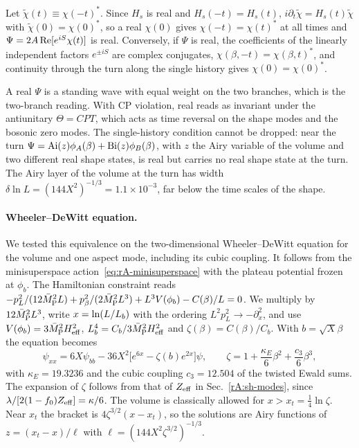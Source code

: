 \begin{rAproof}
Let $\tilde\chi(t)\equiv\chi(-t)^*$.
Since $H_s$ is real and $H_s(-t)=H_s(t)$, $i\partial_t\tilde\chi=H_s(t)\tilde\chi$ with $\tilde\chi(0)=\chi(0)^*$, so a real $\chi(0)$ gives $\chi(-t)=\chi(t)^*$ at all times and $\Psi=2A\,{\rm Re}[e^{iS}\chi(t)]$ is real.
Conversely, if $\Psi$ is real, the coefficients of the linearly independent factors $e^{\pm iS}$ are complex conjugates, $\chi(\beta,-t)=\chi(\beta,t)^*$, and continuity through the turn along the single history gives $\chi(0)=\chi(0)^*$.
\end{rAproof}

A real $\Psi$ is a standing wave with equal weight on the two branches, which is the two-branch reading.
With CP violation, real reads as invariant under the antiunitary $\Theta=CPT$, which acts as time reversal on the shape modes and the bosonic zero modes.
The single-history condition cannot be dropped: near the turn $\Psi={\rm Ai}(z)\phi_A(\beta)+{\rm Bi}(z)\phi_B(\beta)$, with $z$ the Airy variable of the volume and two different real shape states, is real but carries no real shape state at the turn.
The Airy layer of the volume at the turn has width $\delta\ln L=(144X^2)^{-1/3}=1.1\times10^{-3}$, far below the time scales of the shape. %

\paragraph{Wheeler--DeWitt equation.}
We tested this equivalence on the two-dimensional Wheeler--DeWitt equation for the volume and one aspect mode, including its cubic coupling.
It follows from the minisuperspace action~\eqref{eq:rA-minisuperspace} with the plateau potential frozen at $\phi_b$.
The Hamiltonian constraint reads $-p_L^2/(12\bar M_{\mathrm{P}}^2L)+p_\beta^2/(2\bar M_{\mathrm{P}}^2L^3)+L^3V(\phi_b)-C(\beta)/L=0$.
We multiply by $12\bar M_{\mathrm{P}}^2L^3$, write $x=\ln(L/L_b)$ with the ordering $L^2p_L^2\to-\partial_x^2$, and use $V(\phi_b)=3\bar M_{\mathrm{P}}^2H_{\mathrm{eff}}^2$, $L_b^4=C_b/3\bar M_{\mathrm{P}}^2H_{\mathrm{eff}}^2$ and $\zeta(\beta)=C(\beta)/C_b$.
With $b=\sqrt X\beta$ the equation becomes
\begin{equation}
\psi_{xx}=6X\psi_{bb}-36X^2\big[e^{6x}-\zeta(b)e^{2x}\big]\psi,\qquad
\zeta=1+\frac{\kappa_E}{6}\beta^2+\frac{c_3}{6}\beta^3,
\label{eq:rA-WDWeq}
\end{equation}
with $\kappa_E=19.3236$ and the cubic coupling $c_3=12.504$ of the twisted Ewald sums. %
The expansion of $\zeta$ follows from that of $Z_{\rm eff}$ in Sec.~\ref{rA:sh-modes}, since $\lambda/[2(1-f_0)Z_{\rm eff}]=\kappa/6$.
The volume is classically allowed for $x>x_t=\tfrac14\ln\zeta$.
Near $x_t$ the bracket is $4\zeta^{3/2}(x-x_t)$, so the solutions are Airy functions of $z=(x_t-x)/\ell$ with $\ell=(144X^2\zeta^{3/2})^{-1/3}$.

